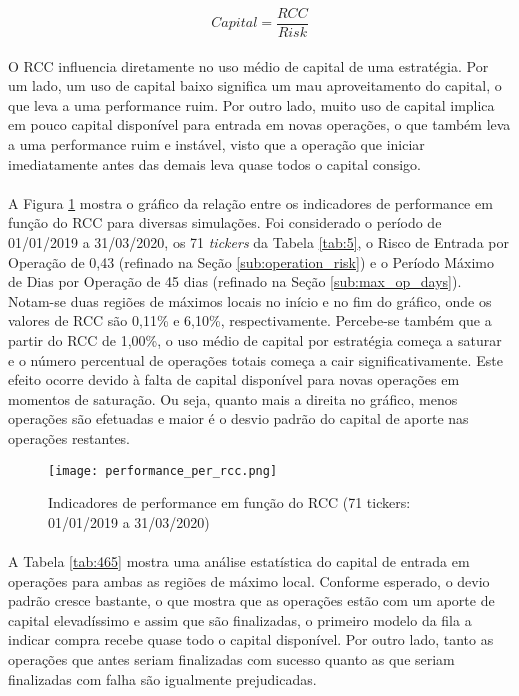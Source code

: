 \begin{equation} \label{eq:61}
    Capital = \dfrac{RCC}{Risk}
\end{equation}

\paragraph{} O RCC influencia diretamente no uso médio de capital de uma estratégia. Por um lado, um uso de capital baixo significa um mau aproveitamento do capital, o que leva a uma performance ruim. Por outro lado, muito uso de capital implica em pouco capital disponível para entrada em novas operações, o que também leva a uma performance ruim e instável, visto que a operação que iniciar imediatamente antes das demais leva quase todos o capital consigo.

\paragraph{} A Figura \ref{fig:550} mostra o gráfico da relação entre os indicadores de performance em função do RCC para diversas simulações. Foi considerado o período de 01/01/2019 a 31/03/2020, os 71 \textit{tickers} da Tabela \ref{tab:5}, o Risco de Entrada por Operação de 0,43 (refinado na Seção \ref{sub:operation_risk}) e o Período Máximo de Dias por Operação de 45 dias (refinado na Seção \ref{sub:max_op_days}). Notam-se duas regiões de máximos locais no início e no fim do gráfico, onde os valores de RCC são 0,11\% e 6,10\%, respectivamente. Percebe-se também que a partir do RCC de 1,00\%, o uso médio de capital por estratégia começa a saturar e o número percentual de operações totais começa a cair significativamente. Este efeito ocorre devido à falta de capital disponível para novas operações em momentos de saturação. Ou seja, quanto mais a direita no gráfico, menos operações são efetuadas e maior é o desvio padrão do capital de aporte nas operações restantes.

\begin{figure}[!htb]
    \texttt{[image: performance\_per\_rcc.png]}
    \centering
    \caption{Indicadores de performance em função do RCC (71 tickers: 01/01/2019 a 31/03/2020)}
    \label{fig:550}
\end{figure}

\paragraph{} A Tabela \ref{tab:465} mostra uma análise estatística do capital de entrada em operações para ambas as regiões de máximo local. Conforme esperado, o devio padrão cresce bastante, o que mostra que as operações estão com um aporte de capital elevadíssimo e assim que são finalizadas, o primeiro modelo da fila a indicar compra recebe quase todo o capital disponível. Por outro lado, tanto as operações que antes seriam finalizadas com sucesso quanto as que seriam finalizadas com falha são igualmente prejudicadas.


